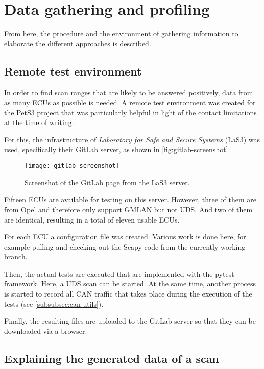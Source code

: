 \chapter{Data gathering and profiling}
\label{sec:data-gathering}

From here, the procedure and the environment of gathering information to elaborate the different approaches is described.

\section{Remote test environment}

In order to find scan ranges that are likely to be answered positively, data from as many ECUs as possible is needed.
A remote test environment was created for the PetS3 project that was particularly helpful in light of the contact limitations at the time of writing.

For this, the infrastructure of \emph{Laboratory for Safe and Secure Systems} (LaS3) was used, specifically their GitLab server, as shown in \autoref{fig:gitlab-screenshot}.

\begin{figure}[htb]
    \centering
    \texttt{[image: gitlab-screenshot]}
    \caption{Screenshot of the GitLab page from the LaS3 server.}
    \label{fig:gitlab-screenshot}
\end{figure}

Fifteen ECUs are available for testing on this server. However, three of them are from Opel and therefore only support GMLAN but not UDS.
And two of them are identical, resulting in a total of eleven usable ECUs.

For each ECU a configuration file was created. 
Various work is done here, for example pulling and checking out the Scapy code from the currently working branch.

Then, the actual tests are executed that are implemented with the pytest framework. Here, a UDS scan can be started. 
At the same time, another process is started to record all CAN traffic that takes place during the execution of the tests (see \autoref{subsubsec:can-utils}).

Finally, the resulting files are uploaded to the GitLab server so that they can be downloaded via a browser.

\section{Explaining the generated data of a scan}

